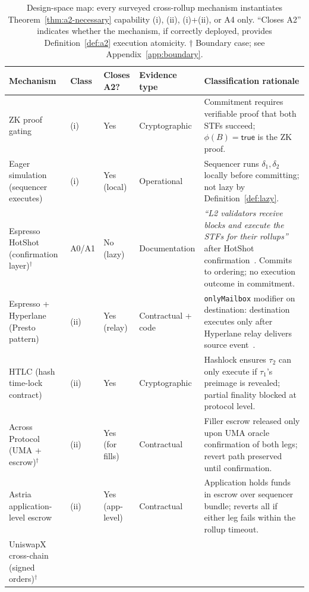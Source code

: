 \begin{table}[t]
\centering
\small
\caption{Design-space map: every surveyed cross-rollup mechanism instantiates
  Theorem~\ref{thm:a2-necessary} capability (i), (ii), (i)+(ii), or A4 only.
  ``Closes A2'' indicates whether the mechanism, if correctly deployed,
  provides Definition~\ref{def:a2} execution atomicity.
  $\dagger$ Boundary case; see Appendix~\ref{app:boundary}.}
\label{tab:designspace}
\renewcommand{\arraystretch}{1.15}
\begin{tabular}{@{}llllp{5.2cm}@{}}
\toprule
Mechanism & Class & Closes A2? & Evidence type & Classification rationale \\
\midrule
ZK proof gating
  & (i) & Yes & Cryptographic
  & Commitment requires verifiable proof that both STFs succeed;
    $\phi(B)=\mathsf{true}$ is the ZK proof. \\
Eager simulation (sequencer executes)
  & (i) & Yes (local)
  & Operational
  & Sequencer runs $\delta_1, \delta_2$ locally before committing;
    not lazy by Definition~\ref{def:lazy}. \\
Espresso HotShot (confirmation layer)$^\dagger$
  & A0/A1 & No (lazy)
  & Documentation
  & \emph{``L2 validators receive blocks and execute the STFs for their
    rollups''} after HotShot confirmation~\cite{Espresso-Architecture}.
    Commits to ordering; no execution outcome in commitment. \\
Espresso + Hyperlane (Presto pattern)
  & (ii) & Yes (relay)
  & Contractual + code
  & \texttt{onlyMailbox} modifier on destination: destination executes
    only after Hyperlane relay delivers source event~\cite{Espresso-Presto}. \\
\midrule
HTLC (hash time-lock contract)
  & (ii) & Yes & Cryptographic
  & Hashlock ensures $\tau_2$ can only execute if $\tau_1$'s preimage
    is revealed; partial finality blocked at protocol level. \\
Across Protocol (UMA + escrow)$^\dagger$
  & (ii) & Yes (for fills)
  & Contractual
  & Filler escrow released only upon UMA oracle confirmation of both
    legs; revert path preserved until confirmation. \\
Astria application-level escrow
  & (ii) & Yes (app-level)
  & Contractual
  & Application holds funds in escrow over sequencer bundle; reverts
    all if either leg fails within the rollup timeout. \\
UniswapX cross-chain (signed orders)$^\dagger$

\end{tabular}
\end{table}

